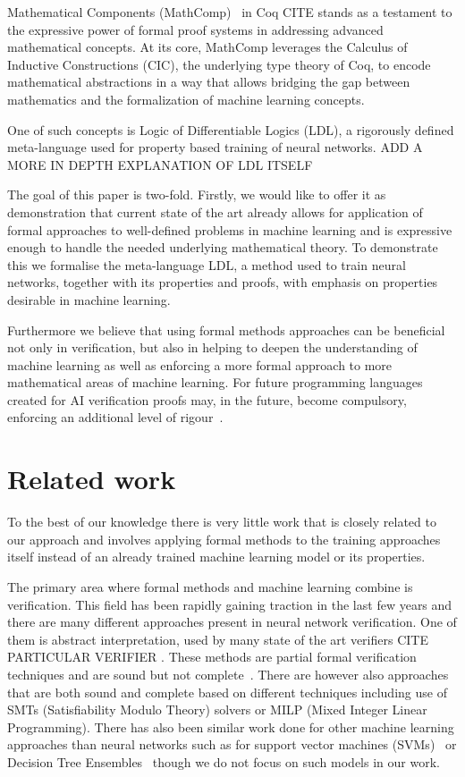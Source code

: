 \documentclass[a4paper,UKenglish,cleveref, autoref, thm-restate]{lipics-v2021}
\begin{document}
Mathematical Components (MathComp)~\cite{mathcomp} in Coq CITE stands as a testament to the expressive power of formal proof systems in addressing advanced mathematical concepts. At its core, MathComp leverages the Calculus of Inductive Constructions (CIC), the underlying type theory of Coq, to encode mathematical abstractions in a way that allows bridging the gap between mathematics and the formalization of machine learning concepts. 

One of such concepts is Logic of Differentiable Logics (LDL), a rigorously defined meta-language used for property based training of neural networks. ADD A MORE IN DEPTH EXPLANATION OF LDL ITSELF

The goal of this paper is two-fold. Firstly, we would like to offer it as demonstration that current state of the art already allows for application of formal approaches to well-defined problems in machine learning and is expressive enough to handle the needed underlying mathematical theory. To demonstrate this we formalise the meta-language LDL, a method used to train neural networks, together with its properties and proofs, with emphasis on properties desirable in machine learning.

Furthermore we believe that using formal methods approaches can be beneficial not only in verification, but also in helping to deepen the understanding of machine learning as well as enforcing a more formal approach to more mathematical areas of machine learning. 
For future programming languages created for AI verification  proofs may, in the future, become compulsory, enforcing an additional level of rigour~\cite{FoMLAS2023:Vehicle_Tutorial_Neural_Network,seshia2022toward}. 

\section{Related work}

To the best of our knowledge there is very little work that is closely related to our approach and involves applying formal methods to the training approaches itself instead of an already trained machine learning model or its properties.

The primary area where formal methods and machine learning combine is verification. This field has been rapidly gaining traction in the last few years and there are many different approaches present in neural network verification\cite{urban2021review,9842406}. One of them is abstract interpretation, used by many state of the art verifiers CITE PARTICULAR VERIFIER . These methods are partial formal verification techniques and are sound but not complete~\cite{easterbrook1998formal}. There are however also approaches that are both sound and complete based on different techniques including use of SMTs (Satisfiability Modulo Theory) \cite{katz2019marabou} solvers or MILP (Mixed Integer Linear Programming). There has also been similar work done for other machine learning approaches than neural networks such as for support vector machines (SVMs)~\cite{ranzato2019robustness} or Decision Tree Ensembles~\cite{einziger2019verifying} though we do not focus on such models in our work. 
\end{document}
